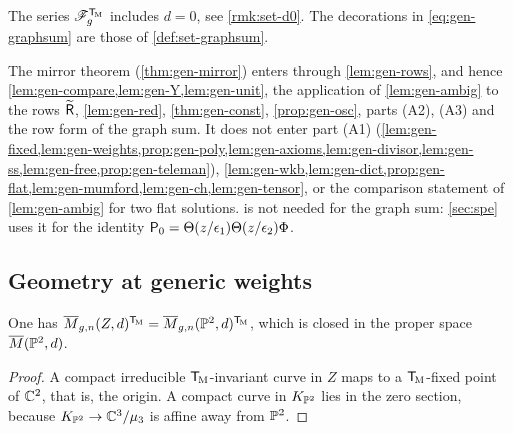 The series $\mathscr{F}_g^{\mathsf{T}_{\!\mathrm{M}}}$ includes $d=0$, see \cref{rmk:set-d0}. The decorations in \cref{eq:gen-graphsum} are those of \cref{def:set-graphsum}.

\begin{rmk}[Dependencies]
\label{rmk:gen-deps}
The mirror theorem (\cref{thm:gen-mirror}) enters through \cref{lem:gen-rows}, and hence \cref{lem:gen-compare,lem:gen-Y,lem:gen-unit}, the application of \cref{lem:gen-ambig} to the rows $\widetilde{\mathsf{R}}$, \cref{lem:gen-red}, \cref{thm:gen-const}, \cref{prop:gen-osc}, parts (A2), (A3) and the row form of the graph sum. It does not enter part (A1) (\cref{lem:gen-fixed,lem:gen-weights,prop:gen-poly,lem:gen-axioms,lem:gen-divisor,lem:gen-ss,lem:gen-free,prop:gen-teleman}), \cref{lem:gen-wkb,lem:gen-dict,prop:gen-flat,lem:gen-mumford,lem:gen-ch,lem:gen-tensor}, or the comparison statement of \cref{lem:gen-ambig} for two flat solutions.  is not needed for the graph sum: \cref{sec:spe} uses it for the identity $\mathsf{P}_0=\Theta(z/\epsilon_1)\Theta(z/\epsilon_2)\Phi$.
\end{rmk}

\subsection{Geometry at generic weights}

\begin{lem}
\label{lem:gen-fixed}
One has $\overline{M}_{g,n}(Z,d)^{\mathsf{T}_{\!\mathrm{M}}}=\overline{M}_{g,n}(\mathbb{P}^2,d)^{\mathsf{T}_{\!\mathrm{M}}}$, which is closed in the proper space $\overline{M}(\mathbb{P}^2,d)$.
\end{lem}
\begin{proof}
A compact irreducible $\mathsf{T}_{\!\mathrm{M}}$-invariant curve in $Z$ maps to a $\mathsf{T}_{\!\mathrm{M}}$-fixed point of $\mathbb{C}^2$, that is, the origin. A compact curve in $K_{\mathbb{P}^2}$ lies in the zero section, because $K_{\mathbb{P}^2}\to\mathbb{C}^3/\mu_3$ is affine away from $\mathbb{P}^2$.
\end{proof}

